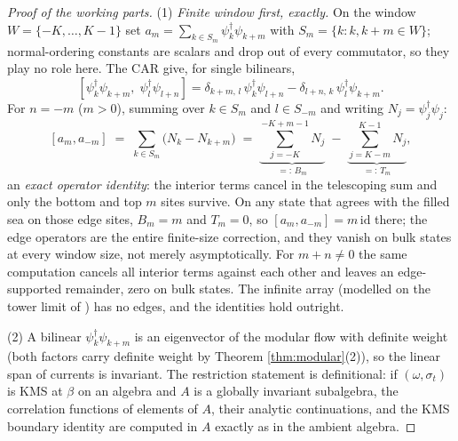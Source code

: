 \documentclass[11pt]{article}
\theoremstyle{definition}
\newcommand{\id}{\mathrm{id}}
\begin{document}
\begin{proof}[Proof of the working parts]
(1) \emph{Finite window first, exactly.} On the window $W = \{-K, \dots, K-1\}$ set $a_m = \sum_{k \in S_m} \psi^\dagger_k \psi_{k+m}$ with $S_m = \{k : k, k+m \in W\}$; normal-ordering constants are scalars and drop out of every commutator, so they play no role here. The CAR give, for single bilinears,
\[
[\psi^\dagger_k \psi_{k+m},\; \psi^\dagger_l \psi_{l+n}] = \delta_{k+m,\,l}\,\psi^\dagger_k\psi_{l+n} - \delta_{l+n,\,k}\,\psi^\dagger_l\psi_{k+m} .
\]
For $n = -m$ ($m > 0$), summing over $k \in S_m$ and $l \in S_{-m}$ and writing $N_j = \psi^\dagger_j\psi_j$:
\[
[a_m, a_{-m}] \;=\; \sum_{k \in S_m} \bigl(N_k - N_{k+m}\bigr)
\;=\; \underbrace{\sum_{j=-K}^{-K+m-1} N_j}_{=:\,B_m} \;-\; \underbrace{\sum_{j=K-m}^{K-1} N_j}_{=:\,T_m} ,
\]
an \emph{exact operator identity}: the interior terms cancel in the telescoping sum and only the bottom and top $m$ sites survive. On any state that agrees with the filled sea on those edge sites, $B_m = m$ and $T_m = 0$, so $[a_m, a_{-m}] = m\,\id$ there; the edge operators are the entire finite-size correction, and they vanish on bulk states at every window size, not merely asymptotically. For $m + n \neq 0$ the same computation cancels all interior terms against each other and leaves an edge-supported remainder, zero on bulk states. The infinite array (modelled on the tower limit of \cite[Thm.~5.6]{ButlerT3}) has no edges, and the identities hold outright.

(2) A bilinear $\psi^\dagger_k\psi_{k+m}$ is an eigenvector of the modular flow with definite weight (both factors carry definite weight by Theorem \ref{thm:modular}(2)), so the linear span of currents is invariant. The restriction statement is definitional: if $(\omega, \sigma_t)$ is KMS at $\beta$ on an algebra and $A$ is a globally invariant subalgebra, the correlation functions of elements of $A$, their analytic continuations, and the KMS boundary identity are computed in $A$ exactly as in the ambient algebra.


\end{proof}
\end{document}
